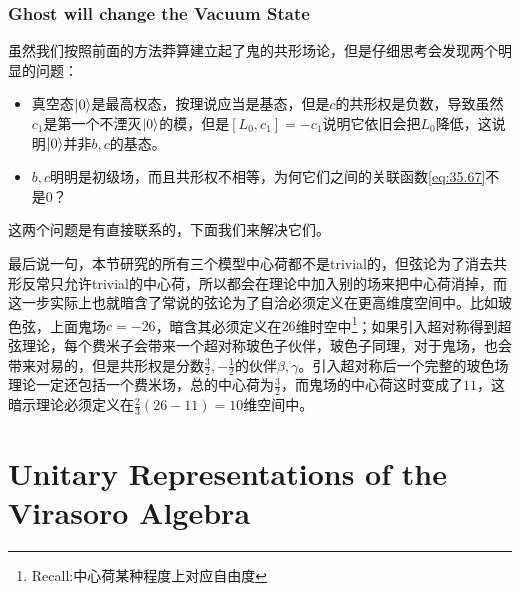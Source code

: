 \subsubsection{Ghost will change the Vacuum State}
虽然我们按照前面的方法莽算建立起了鬼的共形场论，但是仔细思考会发现两个明显的问题：
\begin{itemize}
	\item 真空态$\ket{0}$是最高权态，按理说应当是基态，但是$c$的共形权是负数，导致虽然$c_{1}$是第一个不湮灭$\ket{0}$的模，但是$[L_0,c_1]=-c_1$说明它依旧会把$L_0$降低，这说明$\ket{0}$并非$b,c$的基态。
	
	\item $b,c$明明是初级场，而且共形权不相等，为何它们之间的关联函数\ref{eq:35.67}不是0？
\end{itemize}
这两个问题是有直接联系的，下面我们来解决它们。


\begin{remark}
	最后说一句，本节研究的所有三个模型中心荷都不是trivial的，但弦论为了消去共形反常只允许trivial的中心荷，所以都会在理论中加入别的场来把中心荷消掉，而这一步实际上也就暗含了常说的弦论为了自洽必须定义在更高维度空间中。比如玻色弦，上面鬼场$c=-26$，暗含其必须定义在$26$维时空中\footnote{Recall:中心荷某种程度上对应自由度}；如果引入超对称得到超弦理论，每个费米子会带来一个超对称玻色子伙伴，玻色子同理，对于鬼场，也会带来对易的，但是共形权是分数$\frac32,-\frac12$的伙伴$\beta,\gamma$。引入超对称后一个完整的玻色场理论一定还包括一个费米场，总的中心荷为$\frac32$，而鬼场的中心荷这时变成了$11$，这暗示理论必须定义在$\frac{2}{3}(26-11)=10$维空间中。
\end{remark}

\section{Unitary Representations of the Virasoro Algebra}
